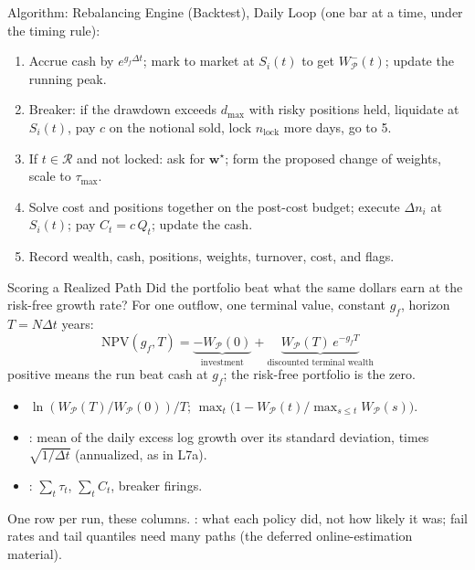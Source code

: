 \documentclass[aspectratio=169,11pt]{beamer}
\newcommand{\bw}{\mathbf{w}}
\newcommand{\Rset}{\mathcal{R}}
\newcommand{\WP}{W_{\mathcal{P}}}
\begin{document}
\begin{frame}{Algorithm: Rebalancing Engine (Backtest), Daily Loop}
  \textbf{} (one bar at a time, under the timing rule):
  \begin{enumerate}\setlength{\itemsep}{0.1em}
    \item Accrue cash by $e^{g_f\Delta t}$; mark to market at $S_i(t)$ to get
      $W^-_{\mathcal P}(t)$; update the running peak.
    \item Breaker: if the drawdown exceeds $d_{\max}$ with risky positions held,
      liquidate at $S_i(t)$, pay $c$ on the notional sold, lock $n_{\mathrm{lock}}$
      more days, go to 5.
    \item If $t\in\Rset$ and not locked: ask for $\bw^\star$; form the proposed
      change of weights, scale to $\tau_{\max}$.
    \item Solve cost and positions together on the post-cost budget; execute
      $\Delta n_i$ at $S_i(t)$; pay $C_t=c\,Q_t$; update the cash.
    \item Record wealth, cash, positions, weights, turnover, cost, and flags.
  \end{enumerate}
\end{frame}

\begin{frame}{Scoring a Realized Path}
  Did the portfolio beat what the same dollars earn at the risk-free growth rate?
  For one outflow, one terminal value, constant $g_f$, horizon $T=N\Delta t$ years:
  \[
    \boxed{\mathrm{NPV}(g_f,T)=\underbrace{-\WP(0)}_{\text{investment}}
      +\underbrace{\WP(T)\,e^{-g_fT}}_{\text{discounted terminal wealth}}}
  \]
  positive means the run beat cash at $g_f$; the risk-free portfolio is the zero.
  \begin{itemize}\setlength{\itemsep}{0.2em}
    \item {} $\ln(\WP(T)/\WP(0))/T$; 
      $\max_t\bigl(1-\WP(t)/\max_{s\le t}\WP(s)\bigr)$.
    \item {}: mean of the daily excess log growth over
      its standard deviation, times $\sqrt{1/\Delta t}$ (annualized, as in L7a).
    \item {}: $\sum_t\tau_t$, $\sum_tC_t$,
      breaker firings.
  \end{itemize}
  One row per run, these columns. : what each policy
  did, not how likely it was; fail rates and tail quantiles need many paths (the deferred online-estimation material).
\end{frame}
\end{document}
